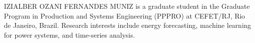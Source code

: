 \documentclass{ieeeaccess}
\begin{document}



\begin{IEEEbiography}{IZIALBER OZANI FERNANDES MUNIZ}
is a graduate student in the Graduate Program in Production and Systems Engineering (PPPRO) at CEFET/RJ, Rio de Janeiro, Brazil. Research interests include energy forecasting, machine learning for power systems, and time-series analysis.
\end{IEEEbiography}

\EOD
\end{document}
